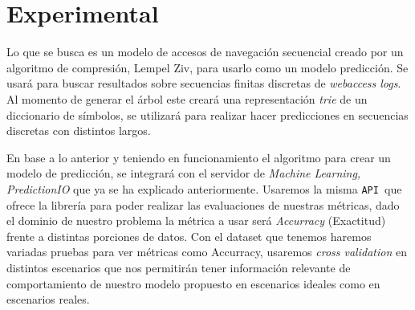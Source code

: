 \chapter[Experimental]{Experimental}\label{ch:experimetal-all}





{
}

Lo que se busca es un modelo de accesos de navegación secuencial creado por un algoritmo de compresión, Lempel Ziv,  para usarlo como un modelo  predicción. Se usará para buscar resultados sobre secuencias finitas discretas de \emph{webaccess logs}. Al momento de generar el árbol este creará una representación \emph{trie} de un diccionario de símbolos, se utilizará para realizar hacer predicciones en secuencias discretas con distintos largos.

En base a lo anterior y teniendo en funcionamiento el algoritmo para crear un modelo de predicción, se integrará con el servidor de \emph{Machine Learning, PredictionIO} que ya se ha explicado anteriormente. Usaremos la misma \texttt{API }que ofrece la librería para poder realizar las evaluaciones de nuestras métricas, dado el dominio de nuestro problema la métrica a usar será \emph{Accurracy} (Exactitud) frente a distintas porciones de datos. Con el dataset que tenemos haremos variadas pruebas para ver métricas como Accurracy, usaremos \emph{cross validation} en distintos escenarios que nos permitirán tener información relevante de comportamiento de nuestro modelo propuesto en escenarios ideales como en escenarios reales.


